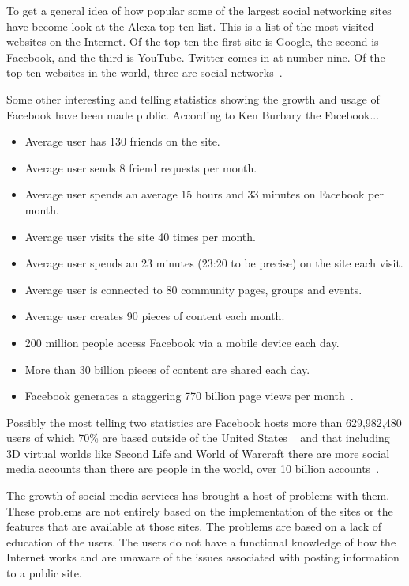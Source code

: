 To get a general idea of how popular some of the largest social networking sites
have become look at the Alexa top ten list. This is a list of the most
visited websites on the Internet. Of the top ten the first site is Google, the
second is Facebook, and the third is YouTube. Twitter comes in at number nine.
Of the top ten websites in the world, three are social networks~\cite{alexa}.

Some other interesting and telling statistics showing the growth and usage of
Facebook have been made public. According to Ken Burbary the Facebook... 

\begin{itemize}
    \item Average user has 130 friends on the site.
    \item Average user sends 8 friend requests per month.
    \item Average user spends an average 15 hours and 33 minutes on Facebook per
        month.
    \item Average user visits the site 40 times per month.
    \item Average user spends an 23 minutes (23:20 to be precise) on the site
        each visit.
    \item Average user is connected to 80 community pages, groups and events.
    \item Average user creates 90 pieces of content each month.
    \item 200 million people access Facebook via a mobile device each day.
    \item More than 30 billion pieces of content are shared each day.
    \item Facebook generates a staggering 770 billion page views per
        month~\cite{smt}.
\end{itemize}

Possibly the most telling two statistics
are Facebook hosts more than
629,982,480 users of which 70\% are based outside of the United
States ~\cite{smt} and that including 3D virtual worlds like Second Life and
World of Warcraft there are more social media accounts than there are people in
the world, over 10 billion accounts~\cite{silicon}.

The growth of social media services has brought a host of problems with them.
These problems are not entirely based on the implementation of the sites or the
features that are available at those sites. The problems are based on a lack of
education of the users. The users do not have a functional knowledge of how
the Internet works and are unaware of the issues associated with posting
information to a public site.


